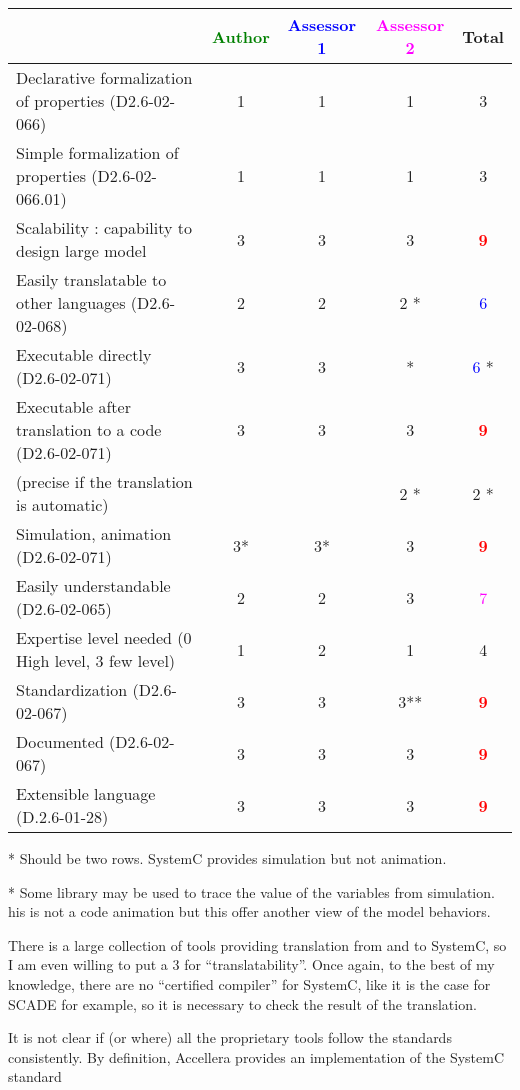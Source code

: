 \begin{tabular}{|l | c | c | c | c|}
  \hline
  & \textcolor{green}{Author} & \textcolor{blue}{Assessor 1} & \textcolor{magenta}{Assessor 2} & Total \\
  \hline
  Declarative formalization of properties (D2.6-02-066) &1 &1 & 1   & 3    \\
  \hline
  Simple formalization of properties (D2.6-02-066.01) &1 &1 &1 & 3    \\
  \hline
  Scalability : capability to design large model &3 &3 & 3    & \textcolor{red}{\textbf{9}} \\
  \hline
  Easily translatable to other languages (D2.6-02-068) & 2    & 2     & 2   * & \textcolor{blue}{6} \\
  \hline
  Executable directly (D2.6-02-071) &3 & 3     & * & \textcolor{blue}{6} * \\
  \hline
  Executable after translation to a code (D2.6-02-071) &3 &3 &3 & \textcolor{red}{\textbf{9}} \\
  (precise if the translation is automatic) & & & 2   *& 2   *\\
  \hline
  Simulation, animation (D2.6-02-071) &3* &3* &3 & \textcolor{red}{\textbf{9}} \\
  \hline
  Easily understandable (D2.6-02-065) &2 &2 &3 & \textcolor{magenta}{7} \\
  \hline
  Expertise level needed (0 High level, 3 few level) &1 &2 &1 & 4    \\
  \hline
  Standardization (D2.6-02-067) &3 &3 &3** & \textcolor{red}{\textbf{9}} \\
  \hline
  Documented (D2.6-02-067) &3 &3 &3 & \textcolor{red}{\textbf{9}} \\
  \hline
  Extensible language (D.2.6-01-28) &3 &3 &3 & \textcolor{red}{\textbf{9}} \\
  \hline
\end{tabular}

\begin{author_comment}
* Should be two rows. SystemC provides simulation but not animation.
\end{author_comment}
\begin{assessor1}
* Some library may be used to trace the value of  the variables from
simulation. his is not a code animation but this offer another view of
the model behaviors.
\end{assessor1}

\begin{assessor2}
\item[(*)] There is a large collection of tools providing translation
  from and to SystemC, so I am even willing to put a 3 for
  ``translatability''. Once again, to the best of my knowledge, there
  are no ``certified compiler'' for SystemC, like it is the case for
  SCADE for example, so it is necessary to check the result of the
  translation.
\item[(**)] It is not clear if (or where) all the proprietary tools
  follow the standards consistently. By definition, Accellera provides
  an implementation of the SystemC standard 
\end{assessor2}

